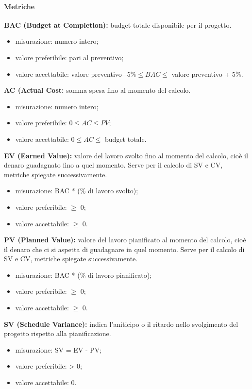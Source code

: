 \paragraph{Metriche}
\textbf{BAC (Budget at Completion):} budget totale disponibile per il progetto.
\begin{itemize}
    \item misurazione: numero intero;
    \item valore preferibile: pari al preventivo;
    \item valore accettabile: valore preventivo$ - 5\% \leq BAC \leq$ valore preventivo + 5\%.
\end{itemize}
\textbf{AC (Actual Cost:} somma spesa fino al momento del calcolo.
\begin{itemize}
    \item misurazione: numero intero;
    \item valore preferibile: $0 \leq AC \leq PV$;
    \item valore accettabile: $0 \leq AC \leq$ budget totale.
\end{itemize}
\textbf{EV (Earned Value):} valore del lavoro svolto fino al momento del calcolo, cioè il denaro guadagnato fino a quel momento.
Serve per il calcolo di SV e CV, metriche spiegate successivamente.
\begin{itemize}
    \item misurazione: BAC * (\% di lavoro svolto);
    \item valore preferibile: $\geq$ 0;
    \item valore accettabile: $\geq$ 0.
\end{itemize}
\textbf{PV (Planned Value):} valore del lavoro pianificato al momento del calcolo, cioè il denaro che ci si aspetta di guadagnare in quel momento.
Serve per il calcolo di SV e CV, metriche spiegate successivamente.
\begin{itemize}
    \item misurazione: BAC * (\% di lavoro pianificato);
    \item valore preferibile: $\geq$ 0;
    \item valore accettabile: $\geq$ 0.
\end{itemize}
\textbf{SV (Schedule Variance):} indica l'aniticipo o il ritardo nello svolgimento del progetto rispetto alla pianificazione.
\begin{itemize}
    \item misurazione: SV = EV - PV;
    \item valore preferibile: > 0;
    \item valore accettabile: 0.
\end{itemize}
